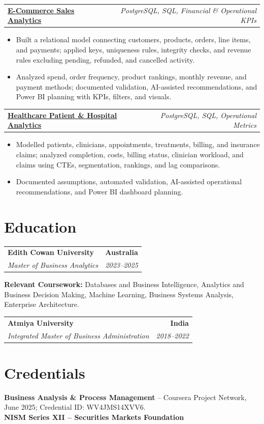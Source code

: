 \documentclass[letterpaper,10pt]{article}
\makeatletter
\newcommand{\role}[4]{%
  \begin{tabularx}{\textwidth}{@{}Xr@{}}
    \textbf{#1} & \textbf{#2} \\
    \textit{#3} & \textit{#4}
  \end{tabularx}\vspace{-1pt}
}
\newcommand{\project}[2]{%
  \begin{tabularx}{\textwidth}{@{}Xr@{}}
    \textbf{#1} & \textit{#2}
  \end{tabularx}\vspace{-1pt}
}
\makeatother
\begin{document}
\project{\href{https://github.com/jainalimehta/Ecommerce-Sales-Analytics}{E-Commerce Sales Analytics}}{PostgreSQL, SQL, Financial \& Operational KPIs}
\begin{itemize}
  \item Built a relational model connecting customers, products, orders, line items, and payments; applied keys, uniqueness rules, integrity checks, and revenue rules excluding pending, refunded, and cancelled activity.
  \item Analyzed spend, order frequency, product rankings, monthly revenue, and payment methods; documented validation, AI-assisted recommendations, and Power BI planning with KPIs, filters, and visuals.
\end{itemize}
\vspace{1pt}

\project{\href{https://github.com/jainalimehta/Healthcare-Analytics}{Healthcare Patient \& Hospital Analytics}}{PostgreSQL, SQL, Operational Metrics}
\begin{itemize}
  \item Modelled patients, clinicians, appointments, treatments, billing, and insurance claims; analyzed completion, costs, billing status, clinician workload, and claims using CTEs, segmentation, rankings, and lag comparisons.
  \item Documented assumptions, automated validation, AI-assisted operational recommendations, and Power BI dashboard planning.
\end{itemize}

\section{Education}
\role{Edith Cowan University}{Australia}{Master of Business Analytics}{2023--2025}
\small\textbf{Relevant Coursework:} Databases and Business Intelligence, Analytics and Business Decision Making, Machine Learning, Business Systems Analysis, Enterprise Architecture.\\[2pt]
\role{Atmiya University}{India}{Integrated Master of Business Administration}{2018--2022}

\section{Credentials}
\small\textbf{Business Analysis \& Process Management} -- Coursera Project Network, June 2025; Credential ID: WV4JMS14XVV6.\\[-0.2pt]
\small\textbf{NISM Series XII -- Securities Markets Foundation}
\end{document}
